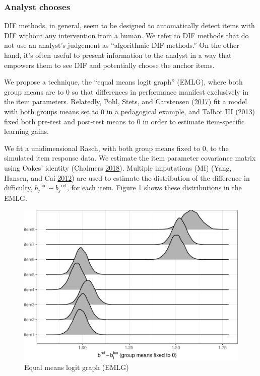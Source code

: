 \documentclass[
  11pt,
]{article}
\begin{document}
\hypertarget{analyst-chooses}{%
\subsubsection{Analyst chooses}\label{analyst-chooses}}

DIF methods, in general, seem to be designed to automatically detect items with DIF without any intervention from a human. We refer to DIF methods that do not use an analyst's judgement as \enquote{algorithmic DIF methods.} On the other hand, it's often useful to present information to the analyst in a way that empowers them to see DIF and potentially choose the anchor items.

We propose a technique, the \enquote{equal means logit graph} (EMLG), where both group means are to 0 so that differences in performance manifest exclusively in the item parameters. Relatedly, Pohl, Stets, and Carstensen (\protect\hyperlink{ref-pohl2017cluster}{2017}) fit a model with both groups means set to 0 in a pedagogical example, and Talbot III (\protect\hyperlink{ref-talbot2013taking}{2013}) fixed both pre-test and post-test means to 0 in order to estimate item-specific learning gains.

We fit a unidimensional Rasch, with both group means fixed to 0, to the simulated item response data. We estimate the item parameter covariance matrix using Oakes' identity (Chalmers \protect\hyperlink{ref-chalmers2018numerical}{2018}). Multiple imputations (MI) (Yang, Hansen, and Cai \protect\hyperlink{ref-yang2012characterizing}{2012}) are used to estimate the distribution of the difference in difficulty, \({b_j}^{\text{foc}} - {b_j}^{\text{ref}}\), for each item. Figure \ref{fig:emlg} shows these distributions in the EMLG.

\begin{figure}[H]

{\centering \includegraphics[width=0.7\linewidth]{paper_files/figure-latex/emlg-1} 

}

\caption{Equal means logit graph (EMLG)}\label{fig:emlg}
\end{figure}
\end{document}
